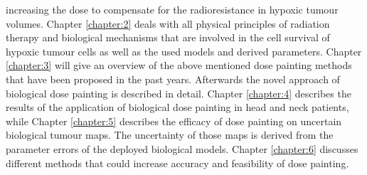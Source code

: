 increasing the dose to compensate for the radioresistance in hypoxic tumour volumes. Chapter \ref{chapter:2} deals with all physical principles of radiation therapy and biological mechanisms that are involved in the cell survival of hypoxic tumour cells as well as the used models and derived parameters. Chapter \ref{chapter:3} will give an overview of the above mentioned dose painting methods that have been proposed in the past years. Afterwards the novel approach of biological dose painting is described in detail. Chapter \ref{chapter:4} describes the results of the application of biological dose painting in head and neck patients, while Chapter \ref{chapter:5} describes the efficacy of dose painting on uncertain biological tumour maps. The uncertainty of those maps is derived from the parameter errors of the deployed biological models. Chapter \ref{chapter:6} discusses different methods that could increase accuracy and feasibility of dose painting.